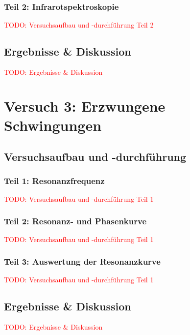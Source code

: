         \subsubsection{Teil 2: Infrarotspektroskopie}
        
            \textcolor{red}{TODO: Versuchsaufbau und -durchführung Teil 2}

    \subsection{Ergebnisse \& Diskussion}

        \textcolor{red}{TODO: Ergebnisse \& Diskussion}

\newpage

\section{Versuch 3: Erzwungene Schwingungen}

    \subsection{Versuchsaufbau und -durchführung}

        \subsubsection{Teil 1: Resonanzfrequenz}
        
            \textcolor{red}{TODO: Versuchsaufbau und -durchführung Teil 1}

        \subsubsection{Teil 2: Resonanz- und Phasenkurve}
        
            \textcolor{red}{TODO: Versuchsaufbau und -durchführung Teil 1}
        
        \subsubsection{Teil 3: Auswertung der Resonanzkurve}
            
            \textcolor{red}{TODO: Versuchsaufbau und -durchführung Teil 1}
    
    \subsection{Ergebnisse \& Diskussion}
        
        \textcolor{red}{TODO: Ergebnisse \& Diskussion}